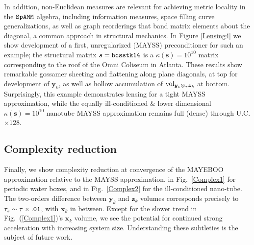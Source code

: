 \documentclass[letterpaper,twocolumn,amsmath,amsfont,amssymb,english,aps,jcp,preprintnumbers,groupaddress,nofootinbib,tightenlines,floatfix]{revtex4}
\newcommand{\mat}[1]{\boldsymbol{#1}}
\newcommand{\ot}{  {\scriptstyle \otimes}_{ \tau } }
\theoremstyle{plain}
\theoremstyle{remark}
\theoremstyle{plain}
\begin{document}
In addition, non-Euclidean measures are relevant for achieving metric locality in 
the $\tt SpAMM$ algebra, including information measures, space filling curve generalizations, as well 
as graph reorderings that band matrix elements about the diagonal, a common approach in 
structural mechanics.   In Figure \ref{Lensing4} we show development of a first, unregularized (MAYSS) 
preconditioner for such an example; the structural matrix $\mat{s}={\tt bcsstk14}$ is a $\kappa(\mat{s})=10^{10}$ matrix 
corresponding to the roof of the Omni Coliseum in Atlanta.  These results show remarkable 
gossamer sheeting and flattening along plane diagonals, at top for development of $\mat{y}_k$, 
as well as hollow accumulation of ${\rm vol}_{\mat{y}_k \ot \mat{z}_k}$ at bottom.
Surprisingly, this example demonstrates lensing for a tight MAYSS approximation, while the 
equally ill-conditioned \& lower dimensional  $\kappa (\mat{s})=10^{10}$ nanotube MAYSS approximation 
remains full (dense) through U.C. $\times 128$.

\subsection{Complexity reduction}
  
Finally, we show complexity reduction at convergence of the MAYEBOO approximation relative to the MAYSS approximation, 
in Fig.~\ref{Complex1} for periodic water boxes, and in Fig.~\ref{Complex2} for the ill-conditioned nano-tube. 
The two-orders difference between $\mat{y}_k$ and $\mat{z}_k$ volumes corresponds precisely to $\tau_s \sim \tau \times {\tt .01}$, 
with $\mat{x}_k$ in between. Except for the slower trend in Fig.~(\ref{Complex1})'s $\mat{x}_k$ volume, we see the 
potential for continued strong acceleration with increasing system size.  Understanding these subtleties is the subject of future work. 
\end{document}
